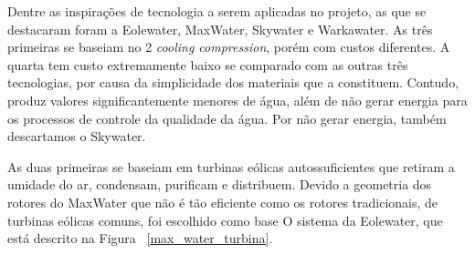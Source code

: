 % 
% 
% 
% 
% 
 
Dentre as inspirações de tecnologia a serem aplicadas no projeto, as que se destacaram foram a Eolewater, MaxWater, Skywater
e Warkawater. As três primeiras se baseiam no 2 \emph{cooling compression}, porém com custos diferentes. A quarta tem custo  
extremamente baixo se comparado com as outras três tecnologias, por causa da simplicidade dos materiais que a constituem.
Contudo, produz valores significantemente menores de água, além de não gerar energia para os processos de controle da qualidade
da água. Por não gerar energia, também descartamos o Skywater.

As duas primeiras se baseiam em turbinas eólicas autossuficientes que retiram a umidade do ar, condensam,
purificam e distribuem. Devido a geometria dos rotores do MaxWater que não é tão eficiente como os rotores tradicionais,
de turbinas eólicas comuns, foi escolhido como base O sistema da Eolewater, que está descrito na Figura ~\ref{max_water_turbina}.

